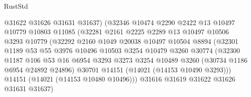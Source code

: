 \begin{lexlean}{RustStd}
\begin{coremodule}
                              @31622
                              @31626
                              @31631
                              @31637)
                            (@32346
                              @10474
                              @2290
                              @2422
                              @13
                              @10497
                              @10779
                              @10803
                              @11085
                              (@32281
                                @2161
                                @2225
                                @2289
                                @13
                                @10497
                                @10506
                                @3293
                                @10779
                                (@32292
                                  @2160
                                  @1049
                                  @20038
                                  @10497
                                  @10504
                                  @8894
                                  (@32301
                                    @1189
                                    @53
                                    @55
                                    @3976
                                    @10496
                                    @10503
                                    @3254
                                    @10479
                                    @3260
                                    @30774
                                    (@32300
                                      @1187
                                      @106
                                      @53
                                      @16
                                      @6954
                                      @3293
                                      @3273
                                      @3254
                                      @10489
                                      @3260
                                      (@30734 @1186 @6954 @24892 @24896)
                                      @30701
                                      @14151
                                      (@14021 (@14153 @10490 @3293)))
                                    @14151
                                    (@14021 (@14153 @10480 @10496)))
                                  @31616
                                  @31619
                                  @31622
                                  @31626
                                  @31631
                                  @31637)

\end{coremodule}
\end{lexlean}
